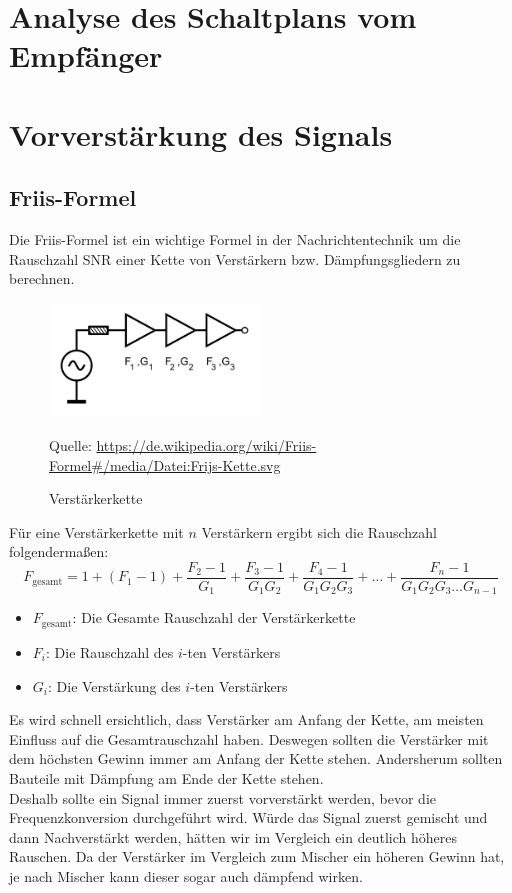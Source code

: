 \section{Analyse des Schaltplans vom Empfänger} %

\section{Vorverstärkung des Signals} %
\subsection{Friis-Formel}
Die Friis-Formel ist ein wichtige Formel in der Nachrichtentechnik um die Rauschzahl SNR einer Kette von Verstärkern
bzw. Dämpfungsgliedern zu berechnen.

\begin{figure}[H]
    \centering
    \includegraphics[width=0.5\textwidth]{Pictures/Frijs-Kette.svg.png}
    \caption{Verstärkerkette}
    \footnotesize{Quelle: \url{https://de.wikipedia.org/wiki/Friis-Formel#/media/Datei:Frijs-Kette.svg}}
\end{figure}
Für eine Verstärkerkette mit $n$ Verstärkern ergibt sich die Rauschzahl folgendermaßen:
\begin{equation}
    F_{\text{gesamt}} = 1 + (F_1 - 1) + \frac{F_2 - 1}{G_1} + \frac{F_3 - 1}{G_1 G_2} + \frac{F_4 - 1}{G_1 G_2 G_3} + \dots + \frac{F_n - 1}{G_1 G_2 G_3 \dots G_{n-1}}
\end{equation}
\begin{itemize}
    \item $F_{\text{gesamt}}$: Die Gesamte Rauschzahl der Verstärkerkette
    \item $F_i$: Die Rauschzahl des $i$-ten Verstärkers
    \item $G_i$: Die Verstärkung des $i$-ten Verstärkers
\end{itemize}
Es wird schnell ersichtlich, dass Verstärker am Anfang der Kette, am meisten Einfluss auf die Gesamtrauschzahl haben.
Deswegen sollten die Verstärker mit dem höchsten Gewinn immer am Anfang der Kette stehen. Andersherum sollten Bauteile mit Dämpfung am Ende der Kette stehen.
\\
Deshalb sollte ein Signal immer zuerst vorverstärkt werden, bevor die Frequenzkonversion durchgeführt wird.
Würde das Signal zuerst gemischt und dann Nachverstärkt werden, hätten wir im Vergleich ein deutlich höheres Rauschen.
Da der Verstärker im Vergleich zum Mischer ein höheren Gewinn hat, je nach Mischer kann dieser sogar auch dämpfend wirken.

